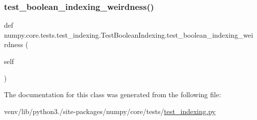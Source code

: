 \subsubsection{\texorpdfstring{test\+\_\+boolean\+\_\+indexing\+\_\+weirdness()}{test\_boolean\_indexing\_weirdness()}}
{\footnotesize\ttfamily def numpy.\+core.\+tests.\+test\+\_\+indexing.\+Test\+Boolean\+Indexing.\+test\+\_\+boolean\+\_\+indexing\+\_\+weirdness (\begin{DoxyParamCaption}\item[{}]{self }\end{DoxyParamCaption})}



The documentation for this class was generated from the following file\+:\begin{DoxyCompactItemize}
\item 
venv/lib/python3./site-\/packages/numpy/core/tests/\hyperlink{test__indexing_8py}{test\+\_\+indexing.\+py}\end{DoxyCompactItemize}
